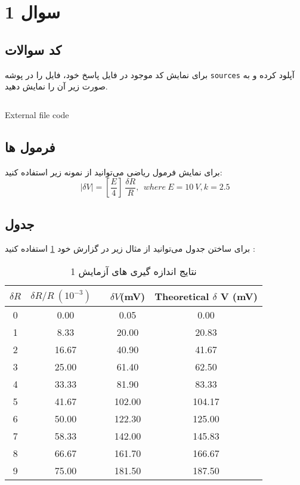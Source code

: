 \section{سوال 1}
\subsection{کد سوالات}

 برای نمایش کد موجود در فایل پاسخ خود،
 فایل را در پوشه 
 \texttt{sources}
 آپلود کرده و به صورت زیر آن را نمایش دهید. 
 
\begin{latin}
\begin{listing}[ht]
    \inputminted{octave}{sources/partition.py}
    \caption{External file code}
    \label{listing:}
\end{listing}
\end{latin}

\subsection{فرمول ها}
\par
برای نمایش فرمول ریاضی می‌توانید از نمونه زیر استفاده کنید:
		\begin{equation}
		|\delta V |=\left[ \frac{E}{4}\right] \ \frac{\delta R}{R}, \ \ where\ E=10\ V, k=2.5
		\end{equation}
\clearpage


\subsection{جدول}
\par
برای ساختن جدول 
 می‌توانید از مثال زیر در گزارش خود
  \ref{t1}
   استفاده کنید :


\begin{table}[!h]
\centering
\begin{latin}
\begin{tabular}{|c|c|c|c|}
	\hline
	$\delta R $ & $\delta R/R \ (10^{-3})$ \  & $ \delta V $(mV) & Theoretical $\delta$ V (mV) \\
	\hline\hline
	0 & 0.00 & 0.05 & 0.00\\
	\hline
	1 & 8.33 & 20.00 &20.83\\
	\hline
	2 & 16.67 & 40.90 &41.67\\
	\hline
	3 & 25.00 & 61.40 &62.50\\
	\hline
	4 & 33.33 & 81.90 &83.33\\
	\hline
	5 & 41.67 & 102.00 &104.17\\
	\hline
	6 & 50.00 & 122.30 &125.00\\
	\hline
	7 & 58.33 & 142.00 &145.83\\
	\hline
	8 & 66.67 & 161.70 &166.67\\
	\hline
	9 & 75.00 & 181.50 &187.50\\
	\hline
\end{tabular}
\end{latin}
\caption{نتایج اندازه گیری های آزمایش 1}
\label{t1}
\end{table}


